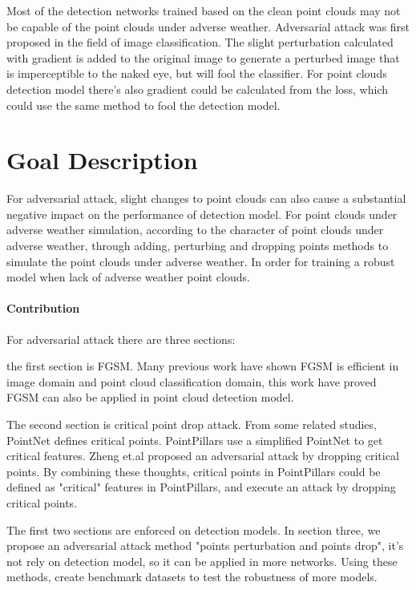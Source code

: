 Most of the detection networks trained based on the clean point clouds may not be capable of the point clouds under adverse weather. Adversarial attack was first proposed in the field of image classification. The slight perturbation calculated with gradient is added to the original image to generate a perturbed image that is imperceptible to the naked eye, but will fool the classifier.
For point clouds detection model there's also gradient could be calculated from the loss, which could use the same method to fool the detection model.

\section{Goal Description}
For adversarial attack, slight changes to point clouds can also cause a substantial negative impact on 
the performance of detection model. For point clouds under adverse weather simulation, according to the character of point clouds under adverse weather, through adding, perturbing and dropping points methods to simulate the point clouds under adverse weather. In order for training a robust model when lack of adverse weather point clouds.
\paragraph{Contribution}
For adversarial attack there are three sections: 

the first section is FGSM. Many previous work have shown FGSM is efficient in image domain and point cloud classification domain\cite{liu_extending_2019}, this work have proved FGSM can also be applied in point cloud detection model. 

The second section is critical point drop attack. From some related studies, PointNet\cite{qi_pointnet_2017-1} defines critical points. PointPillars use a simplified PointNet to get critical features. Zheng et.al \cite{zheng_pointcloud_2019} proposed an adversarial attack by dropping critical points. By combining these thoughts, critical points in PointPillars could be defined as "critical" features in PointPillars, and execute an attack by dropping critical points. 

The first two sections are enforced on detection models.
In section three, we propose an adversarial attack method "points perturbation and points drop", it's not rely on detection model, so it can be applied in more networks. Using these methods, create benchmark datasets to test the robustness of more models. 

